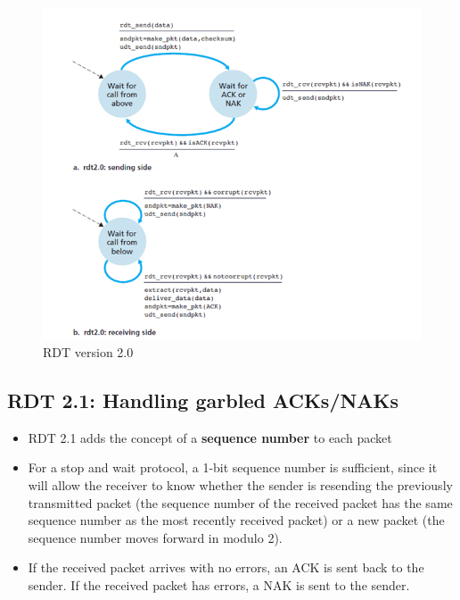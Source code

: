 \documentclass{article}
\theoremstyle{plain}
\theoremstyle{definition}
\begin{document}
\begin{figure}[!h]
    \centering
    \includegraphics[scale=0.8]{rdt2.png}
    \caption{RDT version 2.0}
    \label{fig:my_label_4}
\end{figure}

\subsection{RDT 2.1: Handling garbled ACKs/NAKs}
\begin{itemize}

    \item RDT 2.1 adds the concept of a \textbf{sequence number} to each packet
    
    \item For a stop and wait protocol, a 1-bit sequence number is sufficient,  since it will allow the receiver to know whether the sender is resending the previously transmitted packet (the sequence number of the received packet has the same sequence number as the most recently received packet) or a new packet (the sequence number moves forward in modulo 2).
    
    \item If the received packet arrives with no errors, an ACK is sent back to the sender. If the received packet has errors, a NAK is sent to the sender. 
\end{itemize}
\end{document}
